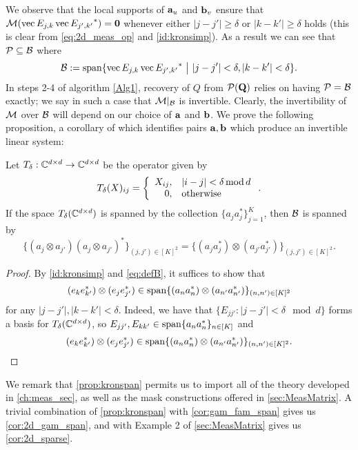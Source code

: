 We observe that the local supports of $\mathbf a_u$ and $\mathbf b_v$ ensure that $\mathcal{M}( \operatorname{vec}{E_{j,k}} \operatorname{vec}{E_{j',k'}}^*) = {\bf 0}$ whenever either $|j - j'| \geq \delta$ or $|k - k'| \geq \delta$ holds (this is clear from \eqref{eq:2d_meas_op} and \eqref{id:kronsimp}).  As a result we can see that $\mathcal{P} \subseteq \mathcal{B}$ where \begin{equation} \mathcal{B} := \operatorname{span}\{ \operatorname{vec}{E_{j,k}} \operatorname{vec}{E_{j',k'}}^* ~{\bf \big |}~  |j - j'| < \delta, |k - k'| < \delta \}. \label{eq:defB} \end{equation}
In steps 2-4 of algorithm \ref{Alg1}, recovery of $Q$ from $\mathcal{P}(\mathbf{Q})$ relies on having $\mathcal{P} = \mathcal{B}$ exactly; we say in such a case that $\mathcal{M}|_{\mathcal{B}}$ is invertible.  Clearly, the invertibility of $\mathcal{M}$ over $\mathcal{B}$ will depend on our choice of $\mathbf a$ and $\mathbf b$.  We prove the following proposition, a corollary of which identifies pairs $\mathbf a, \mathbf b$ which produce an invertible linear system:
\begin{proposition} \label{prop:kronspan}
  Let $T_\delta : \mathbb{C}^{d \times d} \to \mathbb{C}^{d \times d}$ be the operator given by \[T_\delta(X)_{ij} = \left\{\begin{array}{r@{,\quad}l}
  X_{ij} & |i - j| < \delta \mod d \\
  0 & \text{otherwise}\end{array}\right..\]
  If the space $T_{\delta}(\mathbb{C}^{d \times d})$ is spanned by the collection $\{a_j a_j^*\}_{j=1}^K$, then $\mathcal{B}$ is spanned by \[\{(a_j \otimes a_{j'}) (a_j \otimes a_{j'})^*\}_{(j, j') \in [K]^2} = \{(a_j a_j^*) \otimes (a_{j'} a_{j'}^*)\}_{(j, j') \in [K]^2}.\]
\end{proposition}

\begin{proof}
  By \eqref{id:kronsimp} and \eqref{eq:defB}, it suffices to show that $$(e_k e_{k'}^*) \otimes (e_j e_{j'}^*) \in \operatorname{span}\{(a_n a_n^*) \otimes (a_{n'} a_{n'}^*)\}_{(n, n') \in [K]^2}$$ for any $|j - j'|, |k - k'| < \delta$.  Indeed, we have that $\{E_{jj'} : |j - j'| < \delta \mod d\}$ forms a basis for $T_\delta(\mathbb{C}^{d \times d})$, so $E_{j j'}, E_{k k'} \in \operatorname{span}\{a_n a_n^*\}_{n \in [K]}$ and \[(e_k e_{k'}^*) \otimes (e_j e_{j'}^*) \in \operatorname{span}\{(a_n a_n^*) \otimes (a_{n'} a_{n'}^*)\}_{(n, n') \in [K]^2}.\]
\end{proof}

We remark that \cref{prop:kronspan} permits us to import all of the theory developed in \cref{ch:meas_sec}, as well as the mask constructions offered in \cref{sec:MeasMatrix}.  A trivial combination of \cref{prop:kronspan} with \cref{cor:gam_fam_span} gives us \cref{cor:2d_gam_span}, and with Example 2 of \cref{sec:MeasMatrix} gives us \cref{cor:2d_sparse}.

